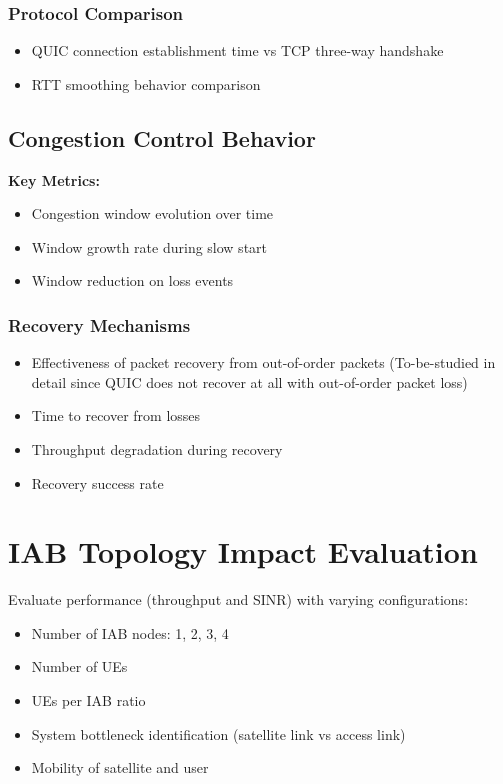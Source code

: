 \documentclass[11pt,a4paper]{article}
\begin{document}
\subsubsection{Protocol Comparison}
\begin{itemize}
    \item QUIC connection establishment time vs TCP three-way handshake
    \item RTT smoothing behavior comparison
\end{itemize}

\subsection{Congestion Control Behavior}
\textbf{Key Metrics:}
\begin{itemize}
    \item Congestion window evolution over time
    \item Window growth rate during slow start
    \item Window reduction on loss events
\end{itemize}

\subsubsection{Recovery Mechanisms}
\begin{itemize}
    \item Effectiveness of packet recovery from out-of-order packets (To-be-studied in detail since QUIC does not recover at all with out-of-order packet loss)
    \item Time to recover from losses
    \item Throughput degradation during recovery
    \item Recovery success rate
\end{itemize}

\section{IAB Topology Impact Evaluation}

Evaluate performance (throughput and SINR) with varying configurations:
\begin{itemize}
    \item Number of IAB nodes: 1, 2, 3, 4
    \item Number of UEs
    \item UEs per IAB ratio
    \item System bottleneck identification (satellite link vs access link)
    \item Mobility of satellite and user
\end{itemize}
\end{document}

